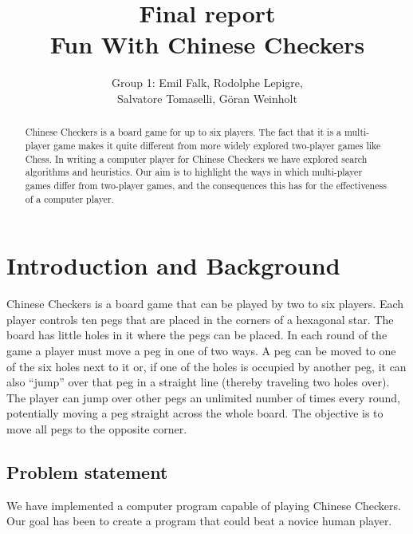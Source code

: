 \documentclass[a4paper,11pt]{article}
\begin{document}
\title{Final report\\Fun With Chinese Checkers}
\author{Group 1: Emil Falk, Rodolphe Lepigre,\\
        Salvatore Tomaselli, G\"oran Weinholt}
\maketitle
\begin{abstract}%
Chinese Checkers is a board game for up to six players. The fact that
it is a multi-player game makes it quite different from more widely
explored two-player games like Chess. In writing a computer player for
Chinese Checkers we have explored search algorithms and heuristics.
Our aim is to highlight the ways in which multi-player games differ
from two-player games, and the consequences this has for the
effectiveness of a computer player.
\end{abstract}

\section{Introduction and Background}
Chinese Checkers is a board game that can be played by two to six players.
Each player controls ten pegs that are placed in the corners of a
hexagonal star. The board has little holes in it where the pegs can be
placed. In each round of the game a player must move a peg in one of
two ways. A peg can be moved to one of the six holes next to it or, if
one of the holes is occupied by another peg, it can also ``jump'' over
that peg in a straight line (thereby traveling two holes over). The
player can jump over other pegs an unlimited number of times every
round, potentially moving a peg straight across the whole board. The
objective is to move all pegs to the opposite corner.

\subsection{Problem statement}
We have implemented a computer program capable of playing Chinese
Checkers. Our goal has been to create a program that could beat a
novice human player.
\end{document}
